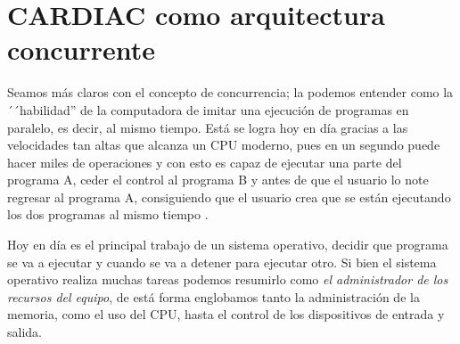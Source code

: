 \documentclass[12pt]{article}
\begin{document}
%	
%		 
%	
%	

	\section{CARDIAC como arquitectura concurrente}
	
	
	Seamos más claros con el concepto de concurrencia; la podemos entender como la ´´habilidad'' de la computadora de imitar una ejecución
	de programas en paralelo, es decir, al mismo tiempo. Está se logra hoy en día gracias a las velocidades tan altas que alcanza un
	CPU moderno, pues en un segundo puede hacer miles de operaciones y con esto es capaz de ejecutar una parte del programa A, ceder el
	control al programa B y antes de que el usuario lo note regresar al programa A, consiguiendo que el usuario crea que se están ejecutando
	los dos programas al mismo tiempo \cite{ben_Ari}. 
	
	Hoy en día es el principal trabajo de un sistema operativo, decidir que programa se va a
	ejecutar y cuando se va a detener para ejecutar otro. Si bien el sistema operativo realiza muchas tareas podemos resumirlo como \textit{el
	administrador de los recursos del equipo}, de está forma englobamos tanto la administración de la memoria, como el uso del CPU, hasta
	el control de los dispositivos de entrada y salida.
	
\end{document}
